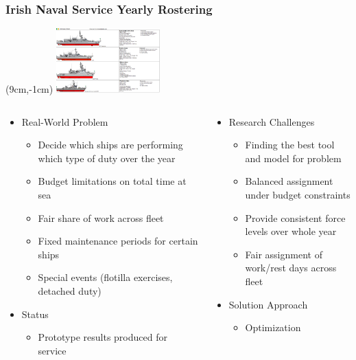 \begin{frame}
\frametitle{Irish Naval Service Yearly Rostering}
\begin{textblock*}{4cm}(9cm,-1cm)
\includegraphics[width=4cm]{images/irish_naval_service_by_zagoreni010_dbaxsq7}
\end{textblock*}
\vspace{1cm}

\begin{columns}[b]
\begin{column}{0.5\textwidth}
\begin{itemize}
\item Real-World Problem
\begin{itemize}
\item Decide which ships are performing which type of duty over the year
\item Budget limitations on total time at sea
\item Fair share of work across fleet
\item Fixed maintenance periods for certain ships
\item Special events (flotilla exercises, detached duty) 
\end{itemize}
\item Status
\begin{itemize}
\item Prototype results produced for service
\end{itemize}
\end{itemize}
\end{column}
\begin{column}{0.5\textwidth}
\begin{itemize}
\item Research Challenges
\begin{itemize}
\item Finding the best tool and model for problem
\item Balanced assignment under budget constraints
\item Provide consistent force levels over whole year
\item Fair assignment of work/rest days across fleet
\end{itemize}
\item Solution Approach
\begin{itemize}
\item Optimization
\end{itemize}
\end{itemize}
\end{column}
\end{columns}
\end{frame}


